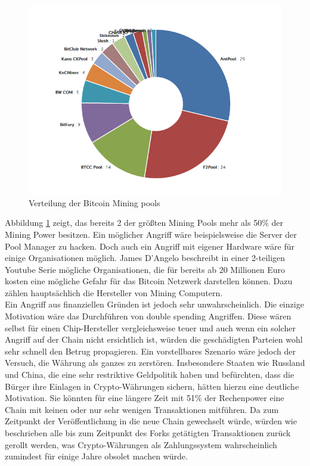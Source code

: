 \begin{figure}[ht]
	\centering
	\includegraphics[scale=0.75]{grafiken/mining_pool_verteilung.png}
	\caption{Verteilung der Bitcoin Mining pools }
	\label{mining_pool_verteilung}
\end{figure}
Abbildung \ref{mining_pool_verteilung} zeigt, das bereits 2 der größten Mining Pools mehr als 50\% der Mining Power besitzen. Ein möglicher Angriff wäre beispielsweise die Server der Pool Manager zu hacken. Doch auch ein Angriff mit eigener Hardware wäre für einige Organisationen möglich. James D'Angelo beschreibt in einer 2-teiligen Youtube Serie mögliche Organisationen, die für bereits ab 20 Millionen Euro kosten eine mögliche Gefahr für das Bitcoin Netzwerk darstellen können. Dazu zählen hauptsächlich die Hersteller von Mining Computern. \cite{Angelo.2014} \cite{Angelo.2014b}\\

Ein Angriff aus finanziellen Gründen ist jedoch sehr unwahrscheinlich. Die einzige Motivation wäre das Durchführen von \glqq double spending\grqq{} Angriffen. Diese wären selbst für einen Chip-Hersteller vergleichsweise teuer und auch wenn ein solcher Angriff auf der Chain nicht ersichtlich ist, würden die geschädigten Parteien wohl sehr schnell den Betrug propagieren. Ein vorstellbares Szenario wäre jedoch der Versuch, die Währung als ganzes zu zerstören. Insbesondere Staaten wie Russland und China, die eine sehr restriktive Geldpolitik haben und befürchten, dass die Bürger ihre Einlagen in Crypto-Währungen sichern, hätten hierzu eine deutliche Motivation. Sie könnten für eine längere Zeit mit 51\% der Rechenpower eine Chain mit keinen oder nur sehr wenigen Transaktionen mitführen. Da zum Zeitpunkt der Veröffentlichung in die neue Chain gewechselt würde, würden wie beschrieben alle bis zum Zeitpunkt des Forks getätigten Transaktionen zurück gerollt werden, was Crypto-Währungen als Zahlungssystem wahrscheinlich zumindest für einige Jahre obsolet machen würde.
